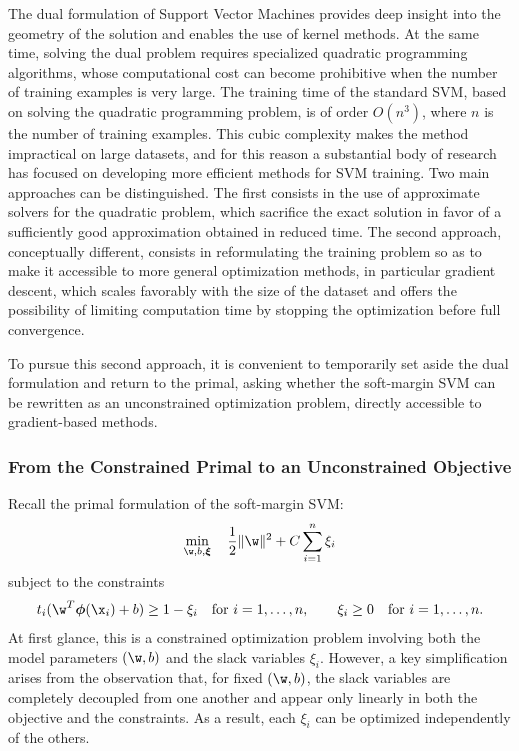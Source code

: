 The dual formulation of Support Vector Machines provides deep insight into the geometry of
the solution and enables the use of kernel methods. At the same time, solving the dual
problem requires specialized quadratic programming algorithms, whose computational cost can
become prohibitive when the number of training examples is very large. The training time of
the standard SVM, based on solving the quadratic programming problem, is of order $O(n^3)$,
where $n$ is the number of training examples. This cubic complexity makes the method
impractical on large datasets, and for this reason a substantial body of research has focused
on developing more efficient methods for SVM training. Two main approaches can be
distinguished. The first consists in the use of approximate solvers for the quadratic
problem, which sacrifice the exact solution in favor of a sufficiently good approximation
obtained in reduced time. The second approach, conceptually different, consists in
reformulating the training problem so as to make it accessible to more general optimization
methods, in particular gradient descent, which scales favorably with the size of the dataset
and offers the possibility of limiting computation time by stopping the optimization before
full convergence.

To pursue this second approach, it is convenient to temporarily set aside the dual
formulation and return to the primal, asking whether the soft-margin SVM can be rewritten
as an unconstrained optimization problem, directly accessible to gradient-based methods.

\subsubsection*{From the Constrained Primal to an Unconstrained Objective}

Recall the primal formulation of the soft-margin SVM:
\begin{equation}
\min_{\w,b,\boldsymbol{\xi}} \quad \frac{1}{2}\|\w\|^2 + C\sum_{i=1}^{n}\xi_i
\end{equation}
subject to the constraints
\begin{equation}
t_i(\w^T\boldsymbol{\phi}(\x_i)+b) \geq 1-\xi_i \quad \text{for } i=1,\ldots,n,
\qquad
\xi_i \geq 0 \quad \text{for } i=1,\ldots,n.
\end{equation}
At first glance, this is a constrained optimization problem involving both the model
parameters $(\w,b)$ and the slack variables $\xi_i$. However, a key simplification arises
from the observation that, for fixed $(\w,b)$, the slack variables are completely decoupled
from one another and appear only linearly in both the objective and the constraints. As a
result, each $\xi_i$ can be optimized independently of the others.

